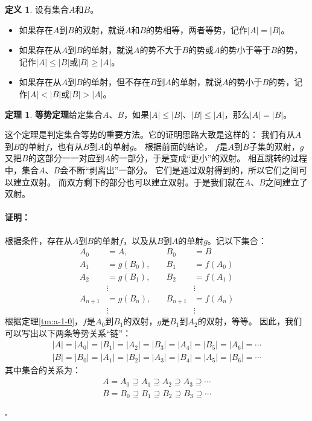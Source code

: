 \documentclass[12pt,UTF8]{ctexbook}
\theoremstyle{definition}
\newtheorem{df}{定义}[section]
\newtheorem{tm}{定理}[section]
\theoremstyle{plain}
\renewenvironment{proof}{\paragraph{\textbf{证明：}}}{\hfill$\square$}
\begin{document}
\begin{appendix}

\begin{df}\label{df:a-1-10}
    设有集合$A$和$B$。
    \begin{itemize}
        \item 如果存在$A$到$B$的双射，就说$A$和$B$的势相等，两者等势，记作$|A| = |B|$。
        \item 如果存在从$A$到$B$的单射，就说$A$的势不大于$B$的势或$A$的势小于等于$B$的势，记作$|A| \leqslant |B|$或$|B| \geqslant |A|$。
        \item 如果存在从$A$到$B$的单射，但不存在$B$到$A$的单射，就说$A$的势小于$B$的势，记作$|A| < |B|$或$|B| > |A|$。
    \end{itemize}
\end{df}

\begin{tm}{\textbf{等势定理}}\label{tm:a-1-10}
    给定集合$A$、$B$，如果$|A| \leqslant |B|$、$|B| \leqslant |A|$，那么$|A| = |B|$。
\end{tm}

这个定理是判定集合等势的重要方法。它的证明思路大致是这样的：
我们有从$A$到$B$的单射$f$，也有从$B$到$A$的单射$g$。
根据前面的结论，
$f$是$A$到$B$子集的双射，$g$又把$B$的这部分一一对应到$A$的一部分，于是变成“更小”的双射。
相互跳转的过程中，集合$A$、$B$会不断“剥离出”一部分。
它们是通过双射得到的，所以它们之间可以建立双射。
而双方剩下的部分也可以建立双射。于是我们就在$A$、$B$之间建立了双射。

\begin{proof}
    根据条件，存在从$A$到$B$的单射$f$，以及从$B$到$A$的单射$g$。记以下集合：
    $$
    \begin{array}{rlrl}
        A_0&= A, \quad & B_0 &= B \\
        A_1&= g(B_0), \quad & B_1 &= f(A_0) \\
        A_2&= g(B_1), \quad & B_2 &= f(A_1) \\
        &\vdots & &\vdots \\
        A_{n+1}&= g(B_n), \quad & B_{n+1} &= f(A_n) \\
        &\vdots & &\vdots
    \end{array}
    $$
    根据定理\ref{tm:a-1-0}，$f$是$A_0$到$B_1$的双射，$g$是$B_1$到$A_2$的双射，等等。
    因此，我们可以写出以下两条等势关系“链”：
    \begin{align*}
        |A| = |A_0| = |B_1| = |A_2| = |B_3| = |A_4| = |B_5| = |A_6| = \cdots  \\
        |B| = |B_0| = |A_1| = |B_2| = |A_3| = |B_4| = |A_5| = |B_6| = \cdots   
    \end{align*}
    其中集合的关系为：
    \begin{align*}
        A = A_0 \supseteq A_1 \supseteq A_2 \supseteq A_3  \supseteq \cdots  \\
        B = B_0 \supseteq B_1 \supseteq B_2 \supseteq B_3  \supseteq \cdots   
    \end{align*}
    

\end{proof}
\end{appendix}
\end{document}

